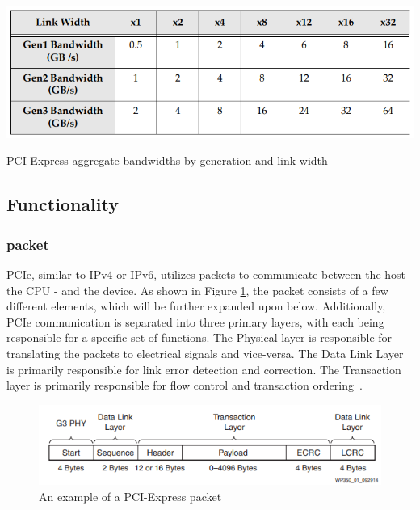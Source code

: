 \begin{table}[htpb]
\includegraphics[width = \linewidth]{figures/PCIE-bandwidths}
\caption{PCI Express aggregate bandwidths by generation and link width ~\cite{jackson_pci_2012}}
\label{tab:bandwidths}
\end{table}

\subsection{Functionality}

\subsubsection{packet}
PCIe, similar to IPv4 or IPv6, utilizes packets to communicate between the host - the CPU - and the device. As shown in Figure \ref{fig:packet}, the packet consists of a few different elements, which will be further expanded upon below. Additionally, PCIe communication is separated into three primary layers, with each being responsible for a specific set of functions. The Physical layer is responsible for translating the packets to electrical signals and vice-versa. The Data Link Layer is primarily responsible for link error detection and correction. The Transaction layer is primarily responsible for flow control and transaction ordering~\cite{lawley_understanding_2014}.

\begin{figure}[htpb]
\includegraphics[width = \linewidth]{figures/PCIE-packet}
\caption{An example of a PCI-Express packet ~\cite{lawley_understanding_2014}}
\label{fig:packet}
\end{figure}

